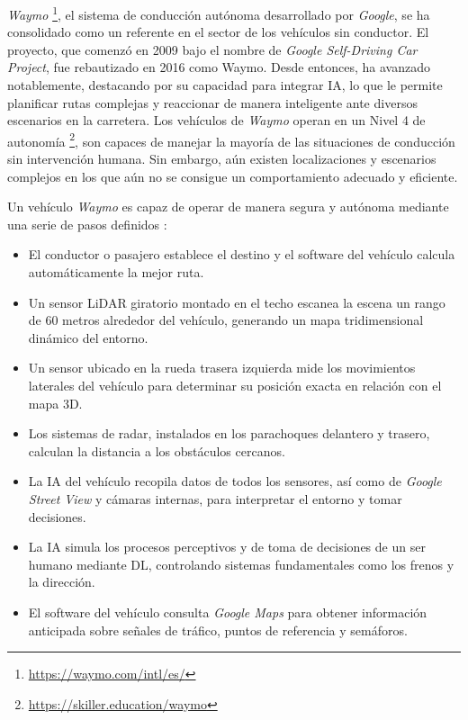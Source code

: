 \textit{Waymo} \footnote{\url{https://waymo.com/intl/es/}}, el sistema de conducción autónoma desarrollado por \textit{ Google}, se ha consolidado como un referente en el sector de los vehículos sin conductor. El proyecto, que comenzó en 2009 bajo el nombre de \textit{Google Self-Driving Car Project}, fue rebautizado en 2016 como {Waymo}. Desde entonces, ha avanzado notablemente, destacando por su capacidad para integrar \ac{IA}, lo que le permite planificar rutas complejas y reaccionar de manera inteligente ante diversos escenarios en la carretera. Los vehículos de \textit{Waymo} operan en un Nivel 4 de autonomía \footnote{\url {https://skiller.education/waymo}}, son capaces de manejar la mayoría de las situaciones de conducción sin intervención humana. Sin embargo, aún existen localizaciones y escenarios complejos en los que aún no se consigue un comportamiento adecuado y eficiente.

Un vehículo \textit{Waymo} es capaz de operar de manera segura y autónoma mediante una serie de pasos definidos \cite{ai-self-driving-cars}:

\begin{itemize}
\item El conductor o pasajero establece el destino y el software del vehículo calcula automáticamente la mejor ruta.
\item Un sensor \ac{LiDAR} giratorio montado en el techo escanea la escena un rango de 60 metros alrededor del vehículo, generando un mapa tridimensional dinámico del entorno.
\item Un sensor ubicado en la rueda trasera izquierda mide los movimientos laterales del vehículo para determinar su posición exacta en relación con el mapa 3D.
\item Los sistemas de radar, instalados en los parachoques delantero y trasero, calculan la distancia a los obstáculos cercanos.
\item La \ac{IA} del vehículo recopila datos de todos los sensores, así como de \textit{Google Street View} y cámaras internas, para interpretar el entorno y tomar decisiones.
\item La \ac{IA} simula los procesos perceptivos y de toma de decisiones de un ser humano mediante \ac{DL}, controlando sistemas fundamentales como los frenos y la dirección.
\item El software del vehículo consulta \textit{Google Maps} para obtener información anticipada sobre señales de tráfico, puntos de referencia y semáforos.
\end{itemize}

